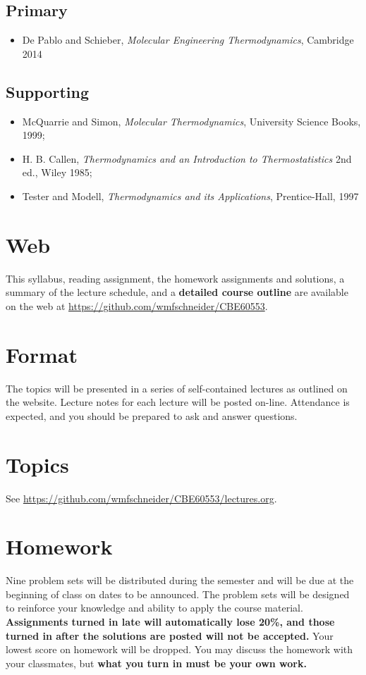 \documentclass[11pt]{article}
\begin{document}
\subsection{Primary}
\label{sec:orgef3b46e}
\begin{itemize}
\item De Pablo and Schieber, \emph{Molecular Engineering Thermodynamics}, Cambridge 2014
\end{itemize}

\subsection{Supporting}
\label{sec:orgb0c640a}
\begin{itemize}
\item McQuarrie and Simon, \emph{Molecular Thermodynamics}, University Science Books, 1999;
\item H. B. Callen, \emph{Thermodynamics and an Introduction to Thermostatistics} 2nd ed., Wiley 1985;
\item Tester and Modell, \emph{Thermodynamics and its Applications}, Prentice-Hall, 1997
\end{itemize}

\section{Web}
\label{sec:org78ceeeb}
This syllabus, reading assignment, the homework assignments and solutions, a summary of the lecture schedule, and a \textbf{detailed course outline} are available on the web at \url{https://github.com/wmfschneider/CBE60553}.

\section{Format}
\label{sec:orgae2e84a}
The topics will be presented in a series of self-contained lectures as
outlined on the website. Lecture notes for each lecture will be posted
on-line. Attendance is expected, and you should be prepared to ask
and answer questions.

\section{Topics}
\label{sec:org7780ff7}
See \href{https://github.com/wmfschneider/CBE60553/blob/master/lectures.org}{\url{https://github.com/wmfschneider/CBE60553/lectures.org}}.

\section{Homework}
\label{sec:orgedcec21}
Nine problem sets will be distributed during the semester and will be due at the beginning of class on dates to be announced. The problem sets will be designed to reinforce your knowledge and ability to apply the course material.  \textbf{Assignments turned in late will automatically lose 20\%, and those turned in after the solutions are posted will not be accepted.}  Your lowest score on homework will be dropped.  You may discuss the homework with your classmates, but \textbf{what you turn in must be your own work.}
\end{document}
